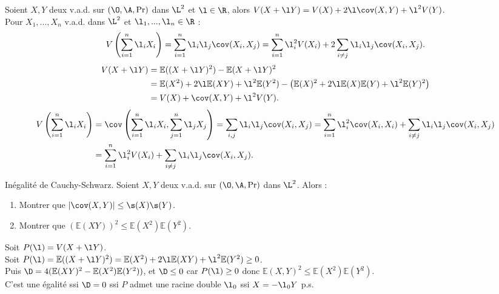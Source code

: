\documentclass[11pt]{article}
\renewcommand*{\E}{\mathbb{E}}
\begin{document}
\begin{prop}{}{}
    Soient $X,Y$ deux v.a.d. sur $(\O,\A,\Pr)$ dans $\L^2$ et $\l\in\R$, alors $V(X+\l Y)=V(X)+2\l\cov(X,Y)+\l^2V(Y)$.\\
    Pour $X_1,...,X_n$ v.a.d. dans $\L^2$ et $\l_1,...,\l_n\in\R$ :
    \begin{equation*}
        V\left(\sum_{i=1}^n \l_i X_i\right) = \sum_{i=1}^n \l_i\l_j\cov(X_i,X_j) = \sum_{i=1}^n\l_i^2 V(X_i) + 2\sum_{i\neq j}\l_i\l_j\cov(X_i, X_j).
    \end{equation*}
    \tcblower
     \begin{align*} V(X+\l Y) &= \E((X+\l Y)^2) - \E(X+\l Y)^2 \\
        &= \E(X^2) + 2\l\E(XY) + \l^2\E(Y^2) - \left( \E(X)^2 + 2\l\E(X)\E(Y) + \l^2\E(Y)^2 \right)\\
        &=V(X) + \cov(X,Y) + \l^2V(Y).
    \end{align*}
     \begin{align*}
        V\left( \sum_{i=1}^n \l_i X_i \right) &= \cov\left( \sum_{i=1}^n \l_iX_i, \sum_{j=1}^n\l_jX_j \right) = \sum_{i,j}\l_i\l_j\cov(X_i, X_j)= \sum_{i=1}^n \l_i^2\cov(X_i,X_i) + \sum_{i\neq j}\l_i\l_j\cov(X_i,X_j)\\
        &=\sum_{i=1}^n \l_i^2V(X_i) + \sum_{i\neq j}\l_i\l_j\cov(X_i,X_j).
    \end{align*}
\end{prop}

\vspace*{-0.8cm}

\begin{prop}{Inégalité de Cauchy-Schwarz.}{}
    Soient $X,Y$ deux v.a.d. sur $(\O,\A,\Pr)$ dans $\L^2$. Alors :
    \begin{enumerate}
        \item Montrer que $|\cov(X,Y)| \leq \s(X)\s(Y)$.
        \item Montrer que $(\E(XY))^2 \leq \E(X^2)\E(Y^2)$.
    \end{enumerate}
    \tcblower
     Soit $P(\l)=V(X+\l Y)$.\\
     Soit $P(\l) = \E((X+\l Y)^2)=\E(X^2) + 2\l \E(XY) + \l^2\E(Y^2)\geq0$.\\
    Puis $\D=4(\E(XY)^2 - \E(X^2)\E(Y^2))$, et $\D\leq 0$ car $P(\l)\geq0$ donc $\E(X,Y)^2 \leq \E(X^2)\E(Y^2)$.\\
    C'est une égalité ssi $\D=0$ ssi $P$ admet une racine double $\l_0$ ssi $X=-\l_0 Y$ p.s.
\end{prop}
\end{document}

